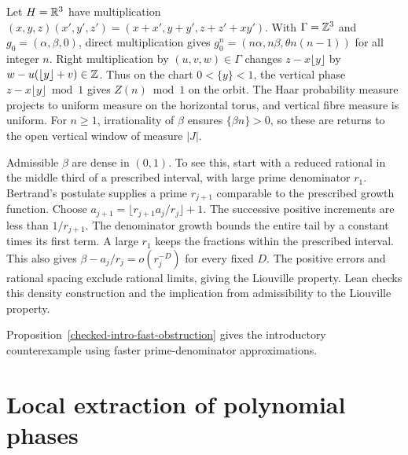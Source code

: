 Let $H=\mathbb R^3$ have multiplication
$(x,y,z)(x',y',z')=(x+x',y+y',z+z'+xy')$.
With $\Gamma=\mathbb Z^3$ and $g_0=(\alpha,\beta,0)$, direct multiplication
gives $g_0^n=(n\alpha,n\beta,\theta n(n-1))$ for all integer $n$.
Right multiplication by $(u,v,w)\in\Gamma$ changes
$z-x\lfloor y\rfloor$ by $w-u(\lfloor y\rfloor+v)\in\mathbb Z$.
Thus on the chart $0<\{y\}<1$, the vertical phase
$z-x\lfloor y\rfloor\bmod1$ gives $Z(n)\bmod1$ on the orbit.
The Haar probability measure projects to uniform measure on the
horizontal torus, and vertical fibre measure is uniform.
For $n\ge1$, irrationality of $\beta$ ensures $\{\beta n\}>0$,
so these are returns to the open vertical window of measure $|J|$.

Admissible $\beta$ are dense in $(0,1)$. To see this, start with a
reduced rational in the middle third of a prescribed interval, with
large prime denominator $r_1$. Bertrand's postulate supplies a
prime $r_{j+1}$ comparable to the prescribed growth function.
Choose $a_{j+1}=\lfloor r_{j+1}a_j/r_j\rfloor+1$.
The successive positive increments are less than $1/r_{j+1}$.
The denominator growth bounds the entire tail by a constant times
its first term. A large $r_1$ keeps the fractions within the prescribed
interval. This also gives $\beta-a_j/r_j=o(r_j^{-D})$ for every
fixed $D$. The positive errors and rational spacing exclude rational
limits, giving the Liouville property. Lean checks this density construction
and the implication from admissibility to the Liouville property.

Proposition~\ref{checked-intro-fast-obstruction} gives the introductory
counterexample using faster prime-denominator approximations.



\section{Local extraction of polynomial phases}

